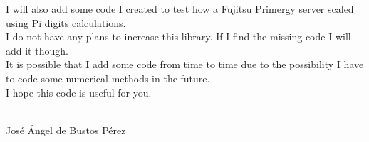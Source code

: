 I will also add some code I created to test how a Fujitsu Primergy server scaled using Pi digits calculations.\\

I do not have any plans to increase this library. If I find the missing code I will add it though.\\

It is possible that I add some code from time to time due to the possibility I have to code some numerical methods in the future.\\

I hope this code is useful for you.\\ \\

\begin{flushright}
Jos\'e \'Angel de Bustos P\'erez  
\end{flushright}

